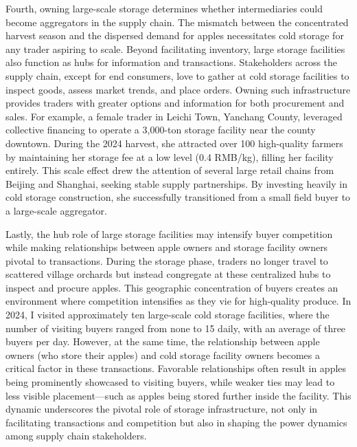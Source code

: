 Fourth, owning large-scale storage determines whether intermediaries could become aggregators in the supply chain. The mismatch between the concentrated harvest season and the dispersed demand for apples necessitates cold storage for any trader aspiring to scale. Beyond facilitating inventory, large storage facilities also function as hubs for information and transactions. Stakeholders across the supply chain, except for end consumers, love to gather at cold storage facilities to inspect goods, assess market trends, and place orders. Owning such infrastructure provides traders with greater options and information for both procurement and sales. For example, a female trader in Leichi Town, Yanchang County, leveraged collective financing to operate a 3,000-ton storage facility near the county downtown. During the 2024 harvest, she attracted over 100 high-quality farmers by maintaining her storage fee at a low level (0.4 RMB/kg), filling her facility entirely. This scale effect drew the attention of several large retail chains from Beijing and Shanghai, seeking stable supply partnerships. By investing heavily in cold storage construction, she successfully transitioned from a small field buyer to a large-scale aggregator.



Lastly, the hub role of large storage facilities may intensify buyer competition while making relationships between apple owners and storage facility owners pivotal to transactions. During the storage phase, traders no longer travel to scattered village orchards but instead congregate at these centralized hubs to inspect and procure apples. This geographic concentration of buyers creates an environment where competition intensifies as they vie for high-quality produce. In 2024, I visited approximately ten large-scale cold storage facilities, where the number of visiting buyers ranged from none to 15 daily, with an average of three buyers per day. However, at the same time, the relationship between apple owners (who store their apples) and cold storage facility owners becomes a critical factor in these transactions. Favorable relationships often result in apples being prominently showcased to visiting buyers, while weaker ties may lead to less visible placement—such as apples being stored further inside the facility. This dynamic underscores the pivotal role of storage infrastructure, not only in facilitating transactions and competition but also in shaping the power dynamics among supply chain stakeholders.



